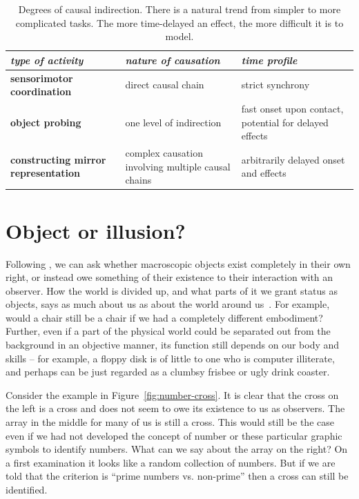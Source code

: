 \begin{table}[htbp]
\begin{center}
\begin{tabular}{|p{5.2cm}|p{4.5cm}|p{4.5cm}|}
\hline
{\it type of activity} & {\it nature of causation} &  {\it time profile} \\ \hline\hline
{\bf sensorimotor coordination} & direct causal chain & strict synchrony \\ \hline
{\bf object probing} & one level of indirection & fast onset upon contact, potential for delayed effects\\ \hline
{\bf constructing mirror representation} &  complex causation involving multiple causal chains & arbitrarily delayed onset and effects\\ \hline
\end{tabular}
\caption{
\label{tab:causation}
%
Degrees of causal indirection. There is a natural
trend from simpler to more complicated tasks.  The more time-delayed
an effect, the more difficult it is to model.
%
}
\end{center}
\end{table}

\section{Object or illusion?}

Following \cite{manzotti01coscienza}, we can ask whether macroscopic
objects exist completely in their own right, or instead owe something
of their existence to their interaction with an observer.  
How the world is divided up, and what parts of it we grant status
as objects, says as much about us as about the world around 
us~\cite{hendriksjansen96catching}.
%
%
For example, would a chair still be a chair if we had a completely different
embodiment? Further, even if a part of the physical world could be
separated out from the background in an objective manner, its function still depends on our
body and skills -- for example, a floppy disk is of
little to one who is computer illiterate, and perhaps can be just regarded as
a clumbsy frisbee or ugly drink coaster.

Consider the example in Figure~\ref{fig:number-cross}. It is
clear that the cross on the left is a cross and does not seem to owe 
its existence to us as observers. The array in the middle for
many of us is still a cross. This would still be the case 
even if we had not developed the concept of number or these particular
graphic symbols to identify numbers. What can we say about the array 
on the right? On a first examination it looks like a random collection
of numbers. But if we are told that the criterion is ``prime numbers 
vs. non-prime'' then a cross can still be identified.

